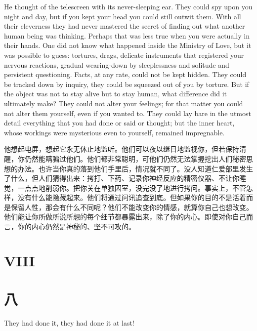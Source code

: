 \begin{paracol}{2}
He thought of the telescreen with its never-sleeping ear. They could spy
upon you night and day, but if you kept your head you could still outwit
them. With all their cleverness they had never mastered the secret of
finding out what another human being was thinking. Perhaps that was less
true when you were actually in their hands. One did not know what
happened inside the Ministry of Love, but it was possible to guess:
tortures, drags, delicate instruments that registered your nervous
reactions, gradual wearing-down by sleeplessness and solitude and
persistent questioning. Facts, at any rate, could not be kept hidden.
They could be tracked down by inquiry, they could be squeezed out of you
by torture. But if the object was not to stay alive but to stay human,
what difference did it ultimately make? They could not alter your
feelings; for that matter you could not alter them yourself, even if you
wanted to. They could lay bare in the utmost detail everything that you
had done or said or thought; but the inner heart, whose workings were
mysterious even to yourself, remained impregnable.

\switchcolumn

他想起电屏，想起它永无休止地监听。他们可以夜以继日地监视你，但若保持清醒，你仍然能瞒骗过他们。他们都非常聪明，可他们仍然无法掌握挖出人们秘密思想的办法。也许当你真的落到他们手里后，情况就不同了。没人知道仁爱部里发生了什么，但人们猜得出来：拷打、下药、记录你神经反应的精密仪器、不让你睡觉，一点点地削弱你。把你关在单独囚室，没完没了地进行拷问。事实上，不管怎样，没有什么能隐藏起来。他们将通过问讯追查到底。但如果你的目的不是活着而是保留人性，那会有什么不同呢？他们不能改变你的情感，就算你自己也想改变。他们能让你所做所说所想的每个细节都暴露出来，除了你的内心。即使对你自己而言，你的内心仍然是神秘的、坚不可攻的。

\switchcolumn*


\section{VIII}\label{viii-1}

\switchcolumn

\section*{八}\label{ux5341ux516d}

\switchcolumn*

They had done it, they had done it at last!

\switchcolumn


\end{paracol}
